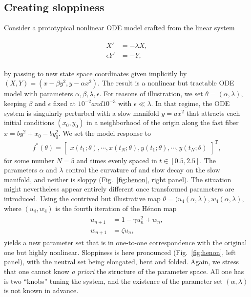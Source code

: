 \subsection{Creating sloppiness} \label{sec:hm} Consider a
prototypical nonlinear ODE model crafted from the linear system

\begin{align}
  \begin{aligned}
    X' &= -\lambda X , \\
    \epsilon Y' &= -Y ,
    \label{eqn:sp}
  \end{aligned}
\end{align}

by passing to new state space coordinates given implicitly by
$(X, Y) = (x-\beta y^2 , y - \alpha x^2)$.  The result is a nonlinear
but tractable ODE model with parameters
$\alpha,\beta,\lambda,\epsilon$.  For reasons of illustration, we set
$\theta = (\alpha,\lambda)$, keeping $\beta$ and $\epsilon$ fixed at
$10^{-2} and 10^{-3}$ with $\epsilon \ll \lambda$.  In that regime,
the ODE system is singularly perturbed with a slow manifold
$y = a x^2$ that attracts each initial conditions $(x_0,y_0)$ in a
neighborhood of the origin along the fast fiber
$x = b y^2 + x_0 - b y_0^2$.  We set the model response to
\begin{align}
  f^*(\theta) = \begin{bmatrix} x(t_1;\theta) , \cdots , x(t_{N};\theta) , y(t_1;\theta) , \cdots , y(t_{N};\theta) \end{bmatrix}^\mathrm{T} ,
\end{align}
for some number $N=5$ and times evenly spaced in $t \in [0.5, 2.5]$.
The parameters $\alpha$ and $\lambda$ control the curvature of and
slow decay on the slow manifold, and neither is sloppy
(Fig.~\ref{fig:henon}, right panel).  The situation might nevertheless
appear entirely different once transformed parameters are introduced.
Using the contrived but illustrative map
$\theta = (u_4(\alpha,\lambda), w_4(\alpha,\lambda)$, where
$(u_4,w_4)$ is the fourth iteration of the H\'{e}non map
\begin{align}
  \begin{aligned}
    u_{n+1} &= 1 - \gamma u_n^2 + w_n , \\
    w_{n+1} &= \zeta u_n ,
    \label{eqn:henon}
  \end{aligned}
\end{align}
yields a new parameter set that is in one-to-one correspondence with
the original one but highly nonlinear.  Sloppiness is here pronounced
(Fig.~\ref{fig:henon}, left panel), with the neutral set being
elongated, bent and folded.  Again, we stress that one cannot know
\textit{a priori} the structure of the parameter space.  All one has
is two ``knobs'' tuning the system, and the existence of the parameter
set $(\alpha,\lambda)$ is not known in advance.

